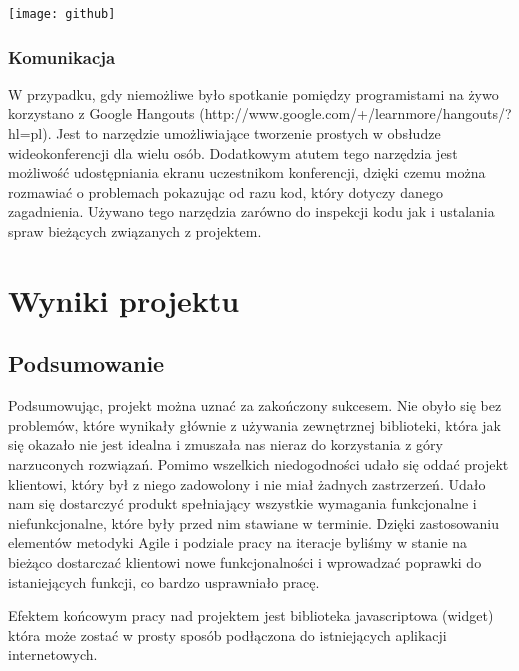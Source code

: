 \documentclass[polish,12pt]{aghthesis}
\begin{document}
\texttt{[image: github]}

\subsubsection{Komunikacja}

W przypadku, gdy niemożliwe było spotkanie pomiędzy programistami na żywo korzystano z Google Hangouts (http://www.google.com/+/learnmore/hangouts/?hl=pl). Jest to narzędzie umożliwiające tworzenie prostych w obsłudze wideokonferencji dla wielu osób. Dodatkowym atutem tego narzędzia jest możliwość udostępniania ekranu uczestnikom konferencji, dzięki czemu można rozmawiać o problemach pokazując od razu kod, który dotyczy danego zagadnienia. Używano tego narzędzia zarówno do inspekcji kodu jak i ustalania spraw bieżących związanych z projektem. 



\section{Wyniki projektu}

\label{sec:wyniki-projektu}

\subsection{Podsumowanie}

Podsumowując, projekt można uznać za zakończony sukcesem. Nie obyło się bez problemów, które wynikały głównie z używania zewnętrznej biblioteki, która jak się okazało nie jest idealna i zmuszała nas nieraz do korzystania z góry narzuconych rozwiązań. Pomimo wszelkich niedogodności udało się oddać projekt klientowi, który był z niego zadowolony i nie miał żadnych zastrzerzeń. Udało nam się dostarczyć produkt spełniający wszystkie wymagania funkcjonalne i niefunkcjonalne, które były przed nim stawiane w terminie. Dzięki zastosowaniu elementów metodyki Agile i podziale pracy na iteracje byliśmy w stanie na bieżąco dostarczać klientowi nowe funkcjonalności i wprowadzać poprawki do istaniejących funkcji, co bardzo usprawniało pracę. 

Efektem końcowym pracy nad projektem jest biblioteka javascriptowa (widget) która może zostać w prosty sposób podłączona do istniejących aplikacji internetowych.
\end{document}
